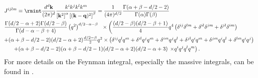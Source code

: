 \begin{align}
\begin{split}
&J^{ijlm}\equiv\rmint \frac{d^d\bf{k}}{(2\pi)^d}\frac{k^ik^jk^lk^m}{\left[{\bf{k}}^2\right]^\alpha\left[({\bf{k}-\bf{q}})^2\right]^\beta}=\frac{1}{(4\pi)^{d/2}}\frac{\Gamma(\alpha+\beta-d/2-2)}{\Gamma(\alpha)\Gamma(\beta)}\\& \frac{\Gamma(d/2-\alpha+2)\Gamma(d/2-\beta)}{\Gamma(d-\alpha-\beta+4)}\left(q^2\right)^{d/2-\alpha-\beta}\,\,\,\,
\times\left(\frac{(d/2-\beta)(d/2-\beta+1)}{4}q^4\left(\delta^{ij}\delta^{lm}+\delta^{il}\delta^{jm}+\delta^{jl}\delta^{im}\right)\right.\\
& \textstyle{
+(\alpha+\beta-d/2-2)(d/2-\alpha+2)\frac{d/2-\beta}{2}q^2 
\times\left(\delta^{ij}q^lq^m+\delta^{il}q^jq^m+\delta^{im}q^jq^l+\delta^{jl}q^iq^m+\delta^{jm}q^iq^l+\delta^{lm}q^iq^j\right)}\\
&\left.\,\,\,\,\,\,\,\,\,
+(\alpha+\beta-d/2-2)(\alpha+\beta-d/2-1)(d/2-\alpha+2)(d/2-\alpha+3)\right.
\left.
\times q^iq^jq^lq^m\right).
\end{split}
\end{align}
For more details on the Feynman integral, especially the massive integrals, can be found in \cite{smirnov}.
